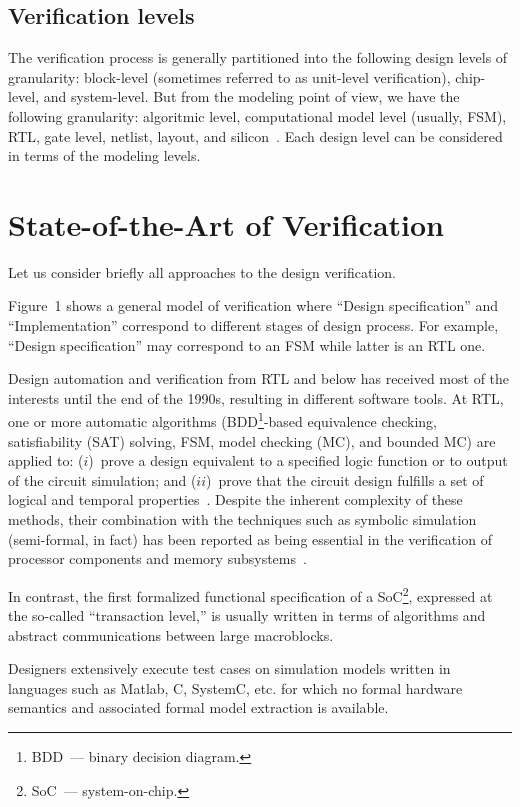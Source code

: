 \begin{multicols}{2}
\subsection{Verification levels} %

    \noindent
The verification process is generally partitioned into the following design levels of granularity: block-level
(sometimes referred to as unit-level verification), chip-level,
and system-level. But from the modeling point of
view, we have the following granularity: algoritmic level, computational model level
(usually, FSM),
  RTL, gate level, netlist, layout, and silicon~\cite{1bar}.
Each design level can be
considered in terms of the modeling levels.

\section{State-of-the-Art of Verification} %

       \noindent
Let us consider briefly all approaches to the design verification.

Figure~1 shows a general model of verification where ``Design specification'' and
``Implementation'' correspond to different stages of design process.
For example, ``Design specification'' may
correspond to an FSM while latter is an RTL one.

   Design automation and verification from RTL and below has received most of the interests until the end of
the 1990s, resulting in different software tools. At RTL, one or more automatic
algorithms (BDD\footnote{BDD~--- binary decision diagram.}-based
equivalence checking, satisfiability (SAT) solving, FSM,
model checking (MC), and bounded MC) are
applied to: ($i$)~prove a design equivalent to a specified logic function or to output of the circuit simulation;
and ($ii$)~prove that the circuit design fulfills a set of logical and temporal properties~\cite{1bar}. Despite the
inherent complexity of these methods, their combination with the techniques such as symbolic simulation
(semi-formal, in fact) has been reported as being essential in the verification of processor components and memory
subsystems~\cite{8bar}.

   In contrast, the first formalized functional specification of a SoC\footnote{SoC~---
system-on-chip.}, expressed at the so-called ``transaction
level,'' is usually written in terms of algorithms and abstract communications between
large macroblocks.

   Designers extensively execute test cases on simu\-lation models written in languages such as Matlab, C,
SystemC, etc. for which no formal hardware semantics and associated formal model extraction is available.


\end{multicols}
